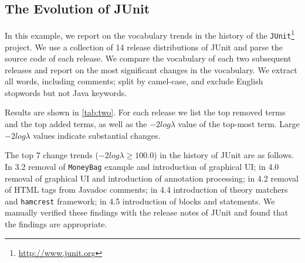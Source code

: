 \documentclass[10pt]{book}
\begin{document}
\subsection{The Evolution of JUnit}\label{example3}

In this example, we report on the vocabulary trends in the history of the \verb$JUnit$\footnote{\url{http://www.junit.org}} project. We use a collection of 14 release distributions of JUnit and parse the source code of each release.  We compare the vocabulary of each two subsequent releases and report on the most significant changes in the vocabulary. We extract all words, including comments; split by camel-case, and exclude English stopwords but not Java keywords.

Results are shown in \autoref{tab:two}. For each release we list the top removed terms and the top added terms, as well as the $-2log\lambda$ value of the top-most term. Large $-2log\lambda$ values indicate substantial changes.

The top 7 change trends (\ie $-2log\lambda \geqslant 100.0$) in the history of JUnit are as follows. In 3.2 removal of \verb$MoneyBag$ example and introduction of graphical UI; in 4.0 removal of graphical UI and introduction of annotation processing; in 4.2 removal of HTML tags from Javadoc comments; in 4.4 introduction of theory matchers and \verb$hamcrest$ framework; in 4.5 introduction of blocks and statements. We manually verified these findings with the release notes of JUnit and found that the findings are appropriate.
 
\end{document}
